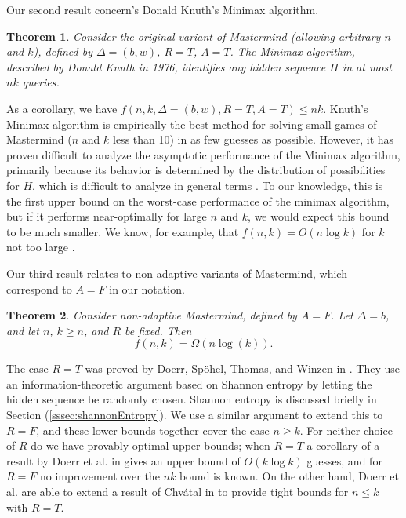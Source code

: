\documentclass[12pt, a4paper]{article}
\newtheorem{theorem}{Theorem}
\begin{document}
Our second result concern's Donald Knuth's Minimax algorithm.
\begin{theorem}\label{minimaxTheorem}
	Consider the original variant of Mastermind (allowing arbitrary $n$ and $k$), defined by $\Delta=(b, w)$, $R=T$, $A=T$. The Minimax algorithm, described by Donald Knuth in 1976, identifies any hidden sequence $H$ in at most $nk$ queries.
\end{theorem}
As a corollary, we have $f(n, k, \Delta=(b,w), R=T, A=T)\le nk$. Knuth's Minimax algorithm is empirically the best method for solving small games of Mastermind ($n$ and $k$ less than 10) in as few guesses as possible. However, it has proven difficult to analyze the asymptotic performance of the Minimax algorithm, primarily because its behavior is determined by the distribution of possibilities for $H$, which is difficult to analyze in general terms \cite{KT86, OS13}. To our knowledge, this is the first upper bound on the worst-case performance of the minimax algorithm, but if it performs near-optimally for large $n$ and $k$, we would expect this bound to be much smaller. We know, for example, that $f(n,k) = O(n \log k)$ for $k$ not too large \cite{DK76, KT86}.

Our third result relates to non-adaptive variants of Mastermind, which correspond to $A=F$ in our notation.
\begin{theorem}\label{nonAdaptiveTheorem}
Consider non-adaptive Mastermind, defined by $A=F$. Let $\Delta = b$, and let $n$, $k \ge n$, and $R$ be fixed. Then
	\begin{equation*}
		f(n, k) = \Omega\left( n\log(k)\right).
	\end{equation*}
\end{theorem}
The case $R = T$ was proved by Doerr, Sp\"ohel, Thomas, and Winzen in \cite{DS13}. They use an information-theoretic argument based on Shannon entropy by letting the hidden sequence be randomly chosen. Shannon entropy is discussed briefly in Section (\ref{sssec:shannonEntropy}).
We use a similar argument to extend this to $R = F$, and
these lower bounds together cover the case $n \geq k$. For neither choice of $R$ do we have provably optimal upper bounds; when $R = T$ a corollary of a result by Doerr et al. in \cite{DS13} gives an upper bound of $O(k \log k)$ guesses, and for $R = F$ no improvement over the $nk$ bound is known. On the other hand, Doerr et al. are able to extend a result of Chv\'atal in \cite{VC83} to provide tight bounds for $n \le k$ with $R = T$.
\end{document}
